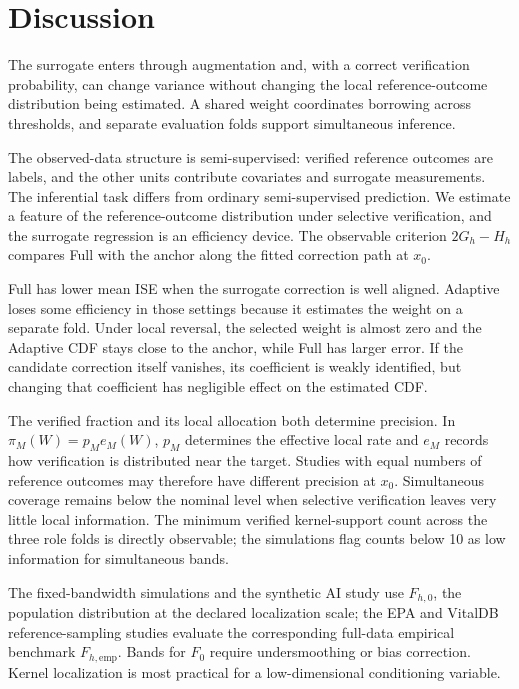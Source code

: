 \section{Discussion}
\label{sec:discussion}

The surrogate enters through augmentation and, with a correct verification
probability, can change variance without changing the local reference-outcome
distribution being estimated. A shared weight coordinates borrowing across
thresholds, and separate evaluation folds support simultaneous inference.

The observed-data structure is semi-supervised: verified reference
outcomes are labels, and the other units contribute covariates and surrogate
measurements. The inferential task differs from ordinary semi-supervised
prediction. We estimate a feature of the reference-outcome distribution under
selective verification, and the surrogate regression is an efficiency device.
The observable criterion \(2G_h-H_h\) compares Full with the anchor along the
fitted correction path at \(x_0\).

Full has lower mean ISE when the surrogate correction is well aligned.
Adaptive loses some efficiency
in those settings because it estimates the weight on a separate fold. Under
local reversal, the selected weight is almost zero and the Adaptive CDF stays
close to the anchor, while Full has larger error. If the candidate correction
itself vanishes, its
coefficient is weakly identified, but changing that coefficient has negligible
effect on the estimated CDF.

The verified fraction and its local allocation both determine precision. In
\(\pi_M(W)=p_Me_M(W)\), \(p_M\) determines the effective local rate and
\(e_M\) records how verification is distributed near the target. Studies with
equal numbers of reference outcomes may therefore have different precision at
\(x_0\). Simultaneous coverage remains below the nominal level when selective
verification leaves very little local information. The minimum verified
kernel-support count across the three role folds is directly observable; the
simulations flag counts below 10 as low information for simultaneous bands.

The fixed-bandwidth simulations and the synthetic AI study use \(F_{h,0}\),
the population distribution at the declared localization scale; the EPA and
VitalDB reference-sampling studies evaluate the corresponding full-data empirical
benchmark \(F_{h,\mathrm{emp}}\). Bands for \(F_0\) require undersmoothing or
bias correction. Kernel localization is most practical for a low-dimensional
conditioning variable.

